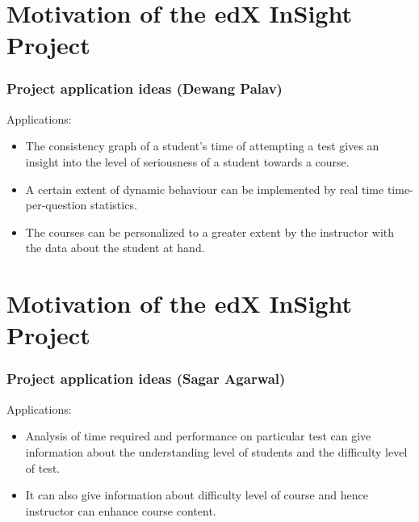\documentclass[12pt,xcolor=dvipsnames]{beamer}
\begin{document}
\section{Motivation of the edX InSight Project}
\begin{frame}[t]
\frametitle{Project application ideas (Dewang Palav)}

Applications:
\begin{itemize}
 \item The consistency graph of a student's time of attempting a test gives an insight into the level of seriousness of a student towards a course.\\
 \item A certain extent of dynamic behaviour can be implemented by real time time-per-question statistics.\\
 \item The courses can be personalized to a greater extent by the instructor with the data about the student at hand.\\
\end{itemize}
\end{frame}

\section{Motivation of the edX InSight Project}
\begin{frame}[t]
\frametitle{Project application ideas (Sagar Agarwal)}

Applications:
\begin{itemize}
\item Analysis of time required and performance on particular test can give information about the understanding level of students and the difficulty level of test.
\item It can also give information about difficulty level of course and hence instructor can enhance course content.

\end{itemize}
\end{frame}

\end{document}
